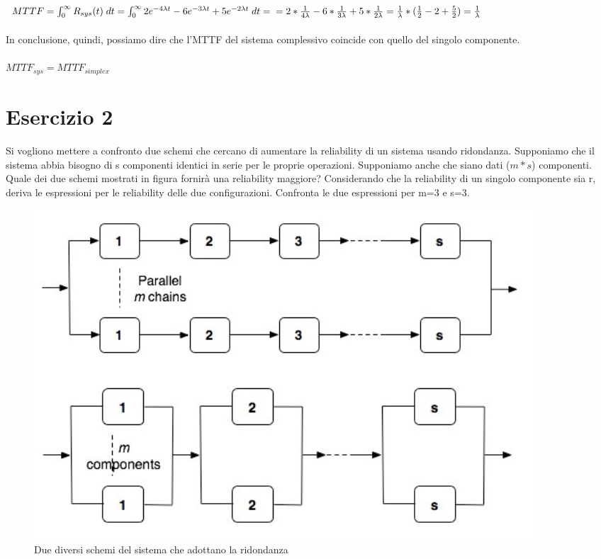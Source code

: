 	$ MTTF=\int_{0}^{\infty}R_{sys}(t)\;dt=\int_{0}^{\infty}2e^{-4\lambda t}-6e^{-3\lambda t}+5e^{-2\lambda t}\;dt=\\=2*\frac{1}{4\lambda}-6*\frac{1}{3\lambda}+5*\frac{1}{2\lambda}=\frac{1}{\lambda}*(\frac{1}{2}-2+\frac{5}{2})=\frac{1}{\lambda} $\\\\
	In conclusione, quindi, possiamo dire che l'MTTF del sistema complessivo coincide con quello del singolo componente.\\\\
	$ MTTF_{sys}=MTTF_{simplex} $
	
	\section{Esercizio 2}
	Si vogliono mettere a confronto due schemi che cercano di aumentare la reliability di 	un sistema usando ridondanza. Supponiamo che il sistema abbia bisogno di s componenti identici in serie per le proprie operazioni. Supponiamo anche che siano 	dati ($m*s$) componenti. Quale dei due schemi mostrati in figura fornirà una reliability 	maggiore? Considerando che la reliability di un singolo componente sia r, deriva le espressioni per le reliability delle due configurazioni. Confronta le due espressioni per m=3 e s=3.
	
	\begin{figure}[H]
		\centering
		\includegraphics[scale=0.8]{./immagine/reliability_es2.png}
		\caption{Due diversi schemi del sistema che adottano la ridondanza}
		\label{fig:reliability_es2}
	\end{figure}
	
